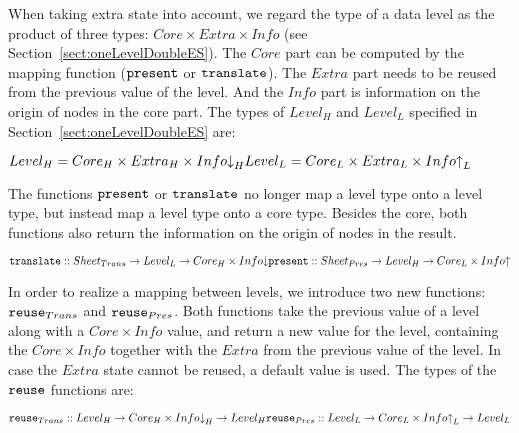 When taking extra state into account, we regard the type of a data level as the product of three types: 
$Core \times Extra \times Info$ (see Section~\ref{sect:oneLevelDoubleES}). The $Core$ part can be computed by the mapping function (${\tt present}$ or ${\tt translate}$). The $Extra$ part needs to be reused from the previous value of the level. And the $Info$ part is information on the origin of nodes in the core part. The types of $Level_{H}$ and $Level_{L}$ specified in Section~\ref{sect:oneLevelDoubleES} are: 

\begin{small}\begin{math} 
Level_{H} = Core_{H} \times Extra_{H} \times Info\idwn_{H}\\
Level_{L} = Core_{L} \times Extra_{L} \times Info\iup_{L}\\
\end{math}\end{small}

The functions ${\tt present}$ or ${\tt translate}$ no longer map a level type onto a level type, but instead map a level type onto a core type. Besides the core, both functions also return the information on the origin of nodes in the result.

\begin{small}\begin{math}
{\tt translate} :: Sheet_{Trans} \rightarrow Level_{L} \rightarrow Core_{H}\times Info\idwn\\
{\tt present} :: Sheet_{Pres} \rightarrow  Level_{H} \rightarrow Core_{L}\times Info\iup\\
\end{math}\end{small}

In order to realize a mapping between levels, we introduce two new functions: ${\tt reuse}_{Trans}$  and
 ${\tt reuse}_{Pres}$. Both functions take the previous value of a level along with a $Core \times Info$ value, and return a new value for the level, containing the $Core \times Info$ together with the $Extra$ from the previous value of the level. In case the $Extra$ state cannot be reused, a default value is used. The types of the ${\tt reuse}$ functions are:

\begin{small}\begin{math}
{\tt reuse}_{Trans} ::  Level_{H} \rightarrow Core_{H} \times Info\idwn_{H} \rightarrow Level_{H}\\
{\tt reuse}_{Pres} ::  Level_{L}  \rightarrow Core_{L} \times Info\iup_{L}    \rightarrow Level_{L}\\
\end{math}\end{small} 

